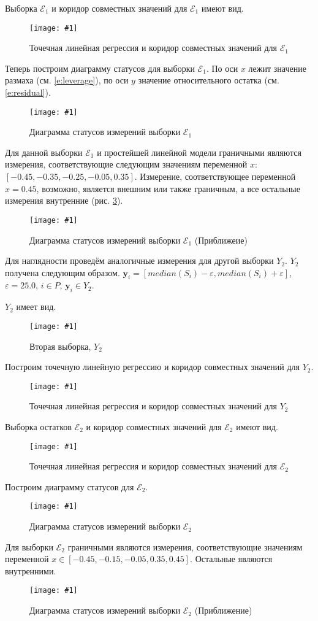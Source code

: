 \documentclass[a4paper,12pt]{article}
\newcommand{\plot}[3]{
  \begin{figure}[H]
    \begin{center}
      \texttt{[image: \#1]}
      \caption{#2}
      \label{#3}
    \end{center}
  \end{figure}
}
\begin{document}
Выборка $ \mathcal{E}_1 $ и коридор совместных значений для $ \mathcal{E}_1 $ имеют вид.
\plot{./images/InformSetCorridorRemX1}{Точечная линейная регрессия и коридор совместных значений для $ \mathcal{E}_1 $}{p:informSetCorridorRemX1}

Теперь построим диаграмму статусов для выборки $ \mathcal{E}_1 $.
По оси $ x $ лежит значение размаха (см. \ref{e:leverage}), по оси $ y $ значение относительного остатка (см. \ref{e:residual}).
\plot{./images/DiagramStatusX1}{Диаграмма статусов измерений выборки $ \mathcal{E}_1 $}{p:diagramStatusX1}

Для данной выборки $ \mathcal{E}_1 $ и простейшей линейной модели граничными являются
измерения, соответствующие следующим значениям переменной $ x $: $ [-0.45, -0.35, -0.25, -0.05, 0.35] $.
Измерение, соответствующее переменной $ x = 0.45 $, возможно, является внешним или также граничным,
а все остальные измерения внутренние (рис. \ref{p:diagramStatusZoomX1}).
\plot{./images/DiagramStatusZoomX1}{Диаграмма статусов измерений выборки $ \mathcal{E}_1 $ (Приближеие)}{p:diagramStatusZoomX1}

Для наглядности проведём аналогичные измерения для другой выборки $ Y_2 $.
$ Y_2 $ получена следующим образом. $ \textbf{y}_i = [median(S_i) - \varepsilon, median(S_i) + \varepsilon] $,
$ \varepsilon = 25.0 $, $ i \in P $, $ \textbf{y}_i \in Y_2 $.

$ Y_2 $ имеет вид.
\plot{./images/SampleX2}{Вторая выборка, $ Y_2 $}{p:sampleX2}

Построим точечную линейную регрессию и коридор совместных значений для $ Y_2 $.
\plot{./images/InformSetCorridorX2}{Точечная линейная регрессия и коридор совместных значений для $ Y_2 $}{p:informSetCorridorX2}

Выборка остатков $ \mathcal{E}_2 $ и коридор совместных значений для $ \mathcal{E}_2 $ имеют вид.
\plot{./images/InformSetCorridorRemX2}{Точечная линейная регрессия и коридор совместных значений для $ \mathcal{E}_2 $}{p:informSetCorridorRemX2}

Построим диаграмму статусов для $ \mathcal{E}_2 $.
\plot{./images/DiagramStatusX2}{Диаграмма статусов измерений выборки $ \mathcal{E}_2 $}{p:diagramStatusX2}

Для выборки $ \mathcal{E}_2 $ граничными являются измерения, соответствующие значениям
переменной $ x \in [-0.45, -0.15, -0.05, 0.35, 0.45] $.
Остальные являются внутренними.
\plot{./images/DiagramStatusZoomX2}{Диаграмма статусов измерений выборки $ \mathcal{E}_2 $ (Приближение)}{p:diagramStatusZoomX2}
\end{document}
